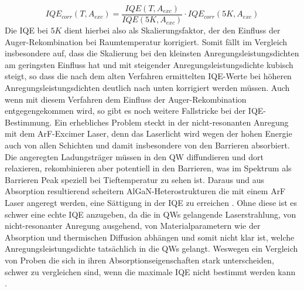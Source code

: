 %
\begin{equation}
    IQE_{corr}(T, A_{exc}) = \frac{IQE(T,A_{exc})}{IQE(5K,A_{exc})} \cdot IQE_{corr}(5K,A_{exc})
    \label{eq:iqetrue300k}
\end{equation}
%
Die IQE bei $5K$ dient hierbei also als Skalierungsfaktor, der den Einfluss der Auger-Rekombination bei Raumtemperatur korrigiert. Somit fällt im Vergleich insbesondere auf, dass die Skalierung bei den kleinsten Anregungsleistungsdichten am geringsten Einfluss hat und mit steigender Anregungsleistungsdichte kubisch steigt, so dass die nach dem alten Verfahren ermittelten IQE-Werte bei höheren Anregungsleistungsdichten deutlich nach unten korrigiert werden müssen. 
Auch wenn mit diesem Verfahren dem Einfluss der Auger-Rekombination entgegengekommen wird, so gibt es noch weitere Fallstricke bei der IQE-Bestimmung. Ein erhebliches Problem steckt in der nicht-resonanten Anregung mit dem ArF-Excimer Laser, denn das Laserlicht wird wegen der hohen Energie auch von allen Schichten und damit insbesondere von den Barrieren absorbiert. Die angeregten Ladungsträger müssen in den QW diffundieren und dort relaxieren, rekombinieren aber potentiell in den Barrieren, was im Spektrum als Barrieren Peak speziell bei Tieftemperatur zu sehen ist.
Daraus und aus Absorption resultierend scheitern AlGaN-Heterostrukturen die mit einem ArF Laser angeregt werden, eine Sättigung in der IQE zu erreichen \cite{doi:10.1063/1.4965298}. Ohne diese ist es schwer eine echte IQE anzugeben, da die in QWs gelangende Laserstrahlung, von nicht-resonanter Anregung ausgehend, von Materialparametern wie der Absorption und thermischen Diffusion abhängen und somit nicht klar ist, welche Anregungsleistungsdichte tatsächlich in die QWs gelangt. Weswegen ein Vergleich von Proben die sich in ihren Absorptionseigenschaften stark unterscheiden, schwer zu vergleichen sind, wenn die maximale IQE nicht bestimmt werden kann \cite{doi:10.1063/1.5044383}. 

